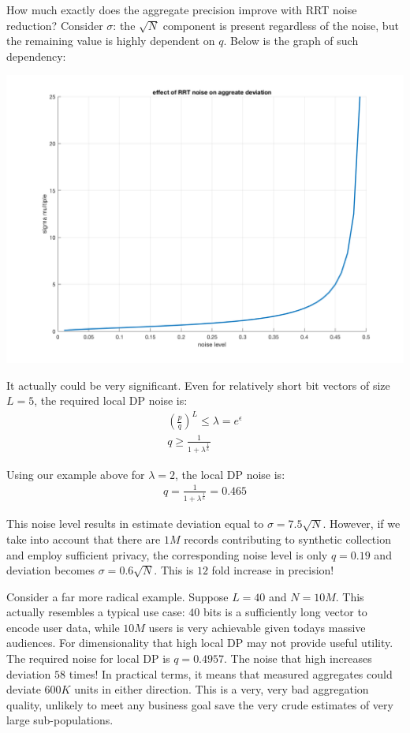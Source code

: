 \documentclass[11pt]{article}
\begin{document}
How much exactly does the aggregate precision improve with RRT noise reduction?
Consider $\sigma$: the $\sqrt{N}$ component is present regardless of the noise, but the remaining value is highly dependent on $q$.  Below is the  graph of such dependency:

 \includegraphics[scale =  0.25]{noise_effect.png}

It actually could be very significant.  Even for relatively short bit vectors of size $L=5$, the required local DP noise is:
 \begin{align}
\left ( \frac{p}{q} \right )^L \le \lambda = e^\epsilon \\
q \ge \frac{1}{1+ \lambda^{\frac{1}{L}}}
\end{align}

Using our example above for $\lambda = 2$, the local DP noise is:
 \begin{align}
q = \frac{1}{1+ \lambda^{\frac{1}{L}}}= 0.465
\end{align}

This noise level results in estimate deviation equal to $\sigma = 7.5 \sqrt{N} $.  However, if we take into account that there are $1M$  records contributing to synthetic collection and employ sufficient privacy, the corresponding noise level is only $q=0.19$ and deviation becomes $\sigma = 0.6 \sqrt{N} $.  This is $12$ fold increase in precision! 

Consider a far more radical example.  Suppose $L=40$ and $N=10M$.   This actually resembles a typical use case: $40$ bits is a sufficiently long vector to encode user data, while $10M$ users is very achievable given todays massive audiences.  For dimensionality that high  local DP may not provide useful utility.  The required noise for local DP is $q=0.4957$.  The noise that high increases deviation $58$ times!  In practical terms, it means that measured aggregates could deviate $600K$ units in either direction.  This is a very, very bad aggregation quality, unlikely to meet any business goal save the very crude estimates of very large sub-populations.
\end{document}
